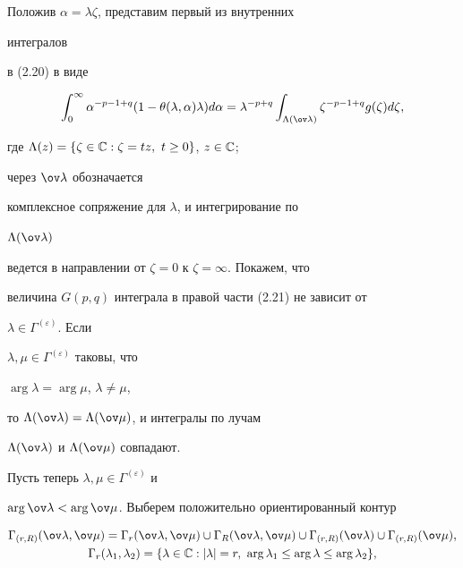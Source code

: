 Положив $\alpha=\lambda\zeta$, представим первый из внутренних 


интегралов 


в (2.20) в виде


\begin{equation}


\int^\infty_0 \alpha^{-p-1+q}(1-\theta(\lambda,\alpha)\lambda)d\alpha


=\lambda^{-p+q}\int_{\Lambda(\ov\lambda)}\zeta^{-p-1+q}


g(\zeta)d\zeta,


\end{equation}


где $\Lambda(z)=\{\zeta\in\Bbb C:\zeta=t z,\ t\ge0\}$, $z\in\Bbb C$; 


через $\ov\lambda$ обозначается 


комплексное сопряжение для $\lambda$, и интегрирование по 


$\Lambda(\ov\lambda)$


ведется в направлении от $\zeta=0$ к $\zeta=\infty$. Покажем, что 


величина $G(p,q)$ интеграла в правой части (2.21) не зависит от 


$\lambda\in\Gamma^{(\varepsilon)}$. Если 


$\lambda,\mu\in\Gamma^{(\varepsilon)}$ таковы, что 


$\arg\lambda=\arg\mu$, $\lambda\ne\mu$,


то $\Lambda(\ov\lambda)=\Lambda(\ov\mu)$, и интегралы по лучам 


$\Lambda(\ov\lambda)$ и $\Lambda(\ov\mu)$ совпадают.


Пусть теперь $\lambda,\mu\in\Gamma^{(\varepsilon)}$ и 


$\arg\ov\lambda<\arg\ov\mu$. Выберем положительно ориентированный контур


\begin{gather*}


\Gamma_{(r,R)}(\ov\lambda,\ov\mu)=\Gamma_r(\ov\lambda,\ov\mu)


\cup \Gamma_R(\ov\lambda,\ov\mu)\cup


\Gamma_{(r,R)}(\ov\lambda)\cup\Gamma_{(r,R)}(\ov\mu), \\


%


\Gamma_r(\lambda_1,\lambda_2)=\{\lambda\in\Bbb C:


|\lambda|=r,\ \arg\lambda_1\le\arg\lambda\le\arg\lambda_2\},


\end{gather*}


